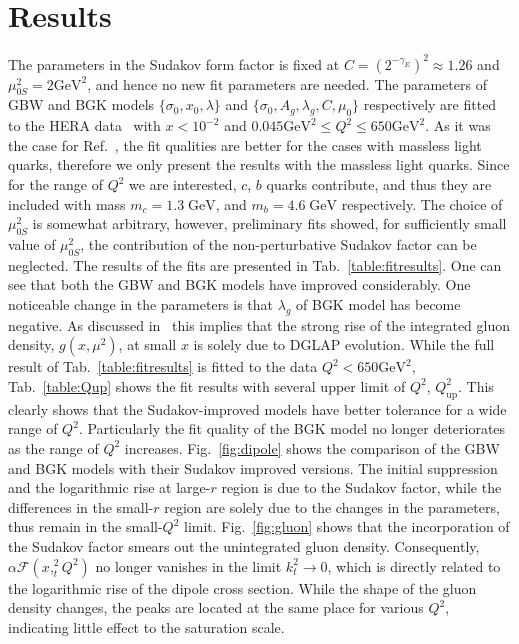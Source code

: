 \documentclass{appolb}
\begin{document}
\section{Results}
The parameters in the Sudakov form factor is fixed at $C=(2^{-\gamma_E})^2\approx1.26$ and $\mu_{0S}^2=2\mathrm{GeV^2}$, and hence no new fit parameters are needed.
The parameters of GBW and BGK models $\{\sigma_0, x_0,\lambda\}$ and $\{\sigma_0,A_g,\lambda_g,C,\mu_0\}$ respectively are fitted to the HERA data~\cite{Abt:2017nkc} with $x<10^{-2}$ and $0.045\mathrm{GeV^2}\leq Q^2\leq 650\mathrm{GeV^2}$. %
As it was the case for Ref.~\cite{Golec-Biernat:2017lfv}, the fit qualities are better for the cases with massless light quarks, therefore we only present the results with the massless light quarks. Since for the range of $Q^2$ we are interested,  $c$, $b$ quarks contribute, and thus they are included with mass $m_c=1.3\;\mathrm{GeV}$, and $m_b=4.6\;\mathrm{GeV}$ respectively. The choice of  $\mu_{0S}^2$ is somewhat arbitrary, however, preliminary fits showed, for sufficiently small value of $\mu_{0S}^2$, the contribution of the non-perturbative Sudakov factor can be neglected. %
The results of the fits are presented in Tab.~\ref{table:fitresults}. One can see that both the GBW and BGK models have improved considerably. One noticeable change in the parameters is that $\lambda_g$ of BGK model has become negative. As discussed in~\cite{Bartels:2002cj} this implies that the strong rise of the integrated gluon density, $g(x,\mu^2)$, at small $x$  is solely due to DGLAP evolution. While the full result of Tab.~\ref{table:fitresults} is fitted to the data $Q^2<650\mathrm{GeV}^2$,  Tab.~\ref{table:Qup} shows the fit results with several upper limit of $Q^2$, $Q_\mathrm{up}^2$. This clearly shows that the Sudakov-improved models have better tolerance for a wide range of $Q^2$. Particularly the fit quality of the BGK model no longer deteriorates as the range of $Q^2$ increases.
Fig.~\ref{fig:dipole} shows the comparison of the  GBW and BGK models with their Sudakov improved versions. The initial suppression and the logarithmic rise at large-$r$ region is due to the Sudakov factor, while the differences in the small-$r$ region are solely due to the changes in the parameters, thus remain in the small-$Q^2$ limit.
Fig.~\ref{fig:gluon} shows that the incorporation of the Sudakov factor smears out the unintegrated gluon density. Consequently, $\alpha \mathcal{F}(x,_t^2 Q^2) $ no longer vanishes in the limit  $k_t^2\rightarrow 0$, which is directly related to the logarithmic rise of the dipole cross section.  While the shape of the gluon density changes, the peaks are located at the same place for various  $Q^2$, indicating little effect to the saturation scale. %
\end{document}
